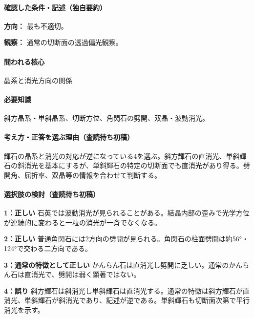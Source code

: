\paragraph{確認した条件・記述（独自要約）}\mbox{}\par

\noindent\textbf{方向：} 最も不適切。\par

\noindent\textbf{観察：} 通常の切断面の透過偏光観察。\par

\paragraph{問われる核心} 晶系と消光方向の関係

\paragraph{必要知識} 斜方晶系・単斜晶系、切断方位、角閃石の劈開、双晶・波動消光。

\paragraph{考え方・正答を選ぶ理由（査読待ち初稿）} 輝石の晶系と消光の対応が逆になっている4を選ぶ。斜方輝石の直消光、単斜輝石の斜消光を基本にするが、単斜輝石の特定の切断面でも直消光があり得る。劈開角、屈折率、双晶等の情報を合わせて判断する。

\paragraph{選択肢の検討（査読待ち初稿）}\mbox{}\par

\noindent\textbf{1：正しい} 石英では波動消光が見られることがある。結晶内部の歪みで光学方位が連続的に変わると一粒の消光が一斉でなくなる。\par

\noindent\textbf{2：正しい} 普通角閃石には2方向の劈開が見られる。角閃石の柱面劈開は約56°・124°で交わる二方向である。\par

\noindent\textbf{3：通常の特徴として正しい} かんらん石は直消光し劈開に乏しい。通常のかんらん石は直消光で、劈開は弱く顕著ではない。\par

\noindent\textbf{4：誤り} 斜方輝石は斜消光し単斜輝石は直消光する。通常の特徴は斜方輝石が直消光、単斜輝石が斜消光であり、記述が逆である。単斜輝石も切断面次第で平行消光を示す。\par

